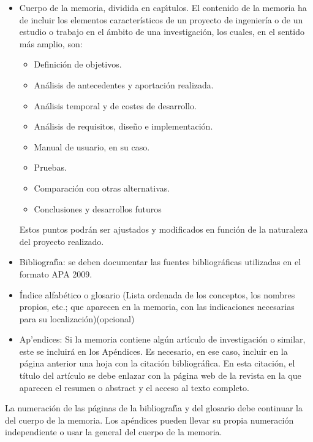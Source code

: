 \begin{itemize}
\begin{itemize}
 \end{itemize}
 \item Cuerpo de la memoria, dividida en cap{\'\i}tulos. El contenido de la memoria ha de incluir 
los elementos característicos de un proyecto de ingeniería o de un estudio o trabajo en el ámbito de una investigación, 
los cuales, en el sentido más amplio, son:
 \begin{itemize}
 \item Definición de objetivos.
\item Análisis de antecedentes y aportación realizada.
\item Análisis temporal y de costes de desarrollo.
\item Análisis de requisitos, diseño e implementación.
\item Manual de usuario, en su caso.
\item Pruebas.
\item Comparación con otras alternativas.
\item Conclusiones y desarrollos futuros
 \end{itemize}
Estos puntos podrán ser ajustados y modificados en función de la naturaleza del proyecto realizado.
 \item Bibliograf{\'\i}a: se deben documentar las fuentes bibliográficas utilizadas en el formato APA 2009.
 \item  Índice alfabético o glosario (Lista ordenada de los conceptos, los nombres propios, etc.; 
 que aparecen en la memoria, con las indicaciones necesarias para su localización)(opcional)
 \item Ap'endices: Si la memoria contiene alg\'un art{\'\i}culo de investigaci\'on o similar, 
 este se incluir\'a en los Ap\'endices. 
 Es necesario, en ese caso, incluir en la página anterior una hoja con la citación bibliográfica. 
 En esta citación, el título del artículo se debe enlazar con la página web de la revista 
 en la que aparecen el resumen o abstract y el acceso al texto completo. 
 \end{itemize}
 La numeraci\'on de las p\'aginas de la bibliograf{\'\i}a y del glosario debe continuar la del cuerpo de la memoria.
 Los ap\'endices pueden llevar su propia numeraci\'on independiente o usar la general del cuerpo de la memoria.



